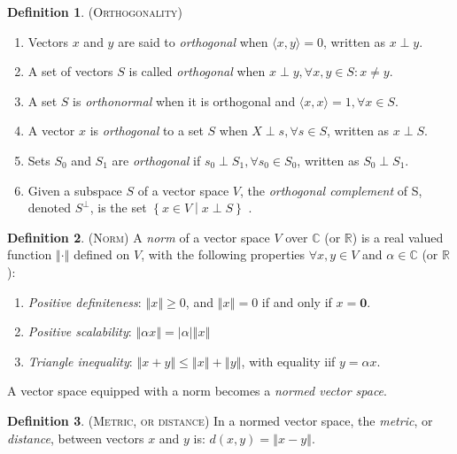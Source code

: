 \documentclass[9pt, twocolumn]{extarticle}
\theoremstyle{definition}
\newtheorem{definition}{Definition}
\newcommand{\norm}[1]{\left\Vert #1\right\Vert}
\begin{document}
\begin{definition}{(\textsc{Orthogonality})}
  \begin{enumerate}[label=(\roman*)]
    \item Vectors $ x $ and $ y $ are said to \emph{orthogonal} when $ \langle x,y\rangle = 0 $, written as $ x\perp y $.
    \item A set of vectors $ S $ is called \emph{orthogonal} when $ x\perp y, \forall x,y\in S: x\neq y $.
    \item A set $ S $ is \emph{orthonormal} when it is orthogonal and $ \langle x,x\rangle = 1, \forall x\in S $.
    \item A vector $ x $ is \emph{orthogonal} to a set $ S $ when $ X\perp s, \forall s\in S $, written as $ x\perp S $.
    \item Sets $ S_0 $ and $ S_1 $ are \emph{orthogonal} if $ s_0\perp S_1, \forall s_0\in S_0 $, written as $ S_0\perp S_1 $.
    \item Given a subspace $ S $ of a vector space $ V $, the \emph{orthogonal complement} of S, denoted $ S^\perp $, is the set $ \left\{ x\in V\middle|x\perp S\right\} $ .
  \end{enumerate}
\end{definition}

\begin{definition}{(\textsc{Norm})}
  A \emph{norm} of a vector space $ V $ over $ \mathds{C} $ (or $ \mathds{R} $) is a real valued function $ \norm{\cdot} $ defined on $ V $, with the following properties $ \forall x,y\in V $ and $ \alpha\in\mathds{C} $ (or $ \mathds{R} $):
  \begin{enumerate}[label=(\roman*)]
    \item \emph{Positive definiteness}: $ \norm{x} \geq 0 $, and $ \norm{x} = 0 $ if and only if $ x = \textbf{0} $.
    \item \emph{Positive scalability}: $ \norm{\alpha x} = |\alpha|\norm{x} $
    \item \emph{Triangle inequality}: $ \norm{x+y}\leq \norm{x} + \norm{y} $, with equality iif $ y=\alpha x $.
  \end{enumerate}
\end{definition}

A vector space equipped with a norm becomes a \emph{normed vector space}. 

\begin{definition}{(\textsc{Metric, or distance})}
In a normed vector space, the \emph{metric}, or \emph{distance}, between vectors $ x $ and $ y $ is: $ d(x,y)=\norm{x-y} $.
\end{definition}
\end{document}
